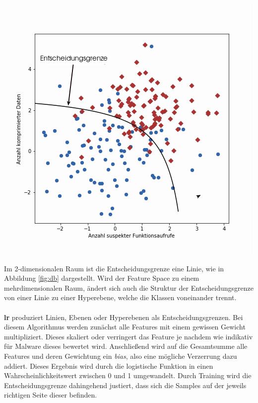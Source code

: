 \documentclass[
    12pt, %
    DIV10,
    ngerman, %
    a4paper, %
    oneside, %
    titlepage, %
    parskip=half, %
    headings=normal, %
    listof=totoc, %
    bibliography=totoc, %
    index=totoc, %
    captions=tableheading, %
    final %
]{scrreprt}
\begin{document}
\begin{center}
\includegraphics[scale=0.6]{img/db.png}
\label{fig:db}
\end{center}
Im 2-dimensionalen Raum ist die Entscheidungsgrenze eine Linie, wie in Abbildung \ref{fig:db} dargestellt. Wird der Feature Space zu einem mehrdimensionalen Raum, ändert sich auch die Struktur der Entscheidungsgrenze von einer Linie zu einer Hyperebene, welche die Klassen voneinander trennt.\\\\
\textbf{\acl{lr}} produziert Linien, Ebenen oder Hyperebenen als Entscheidungsgrenzen. Bei diesem Algorithmus werden zunächst alle Features mit einem gewissen Gewicht multipliziert. Dieses skaliert oder verringert das Feature je nachdem wie indikativ für Malware dieses bewertet wird. Anschlie{\ss}end wird auf die Gesamtsumme alle Features und deren Gewichtung ein \emph{bias}, also eine mögliche Verzerrung dazu addiert. Dieses Ergebnis wird durch die logistische Funktion in einen Wahrscheinlichkeitswert zwischen 0 und 1 umgewandelt. Durch Training wird die Entscheidungsgrenze dahingehend justiert, dass sich die Samples auf der jeweils richtigen Seite dieser befinden.\\\\
\end{document}
